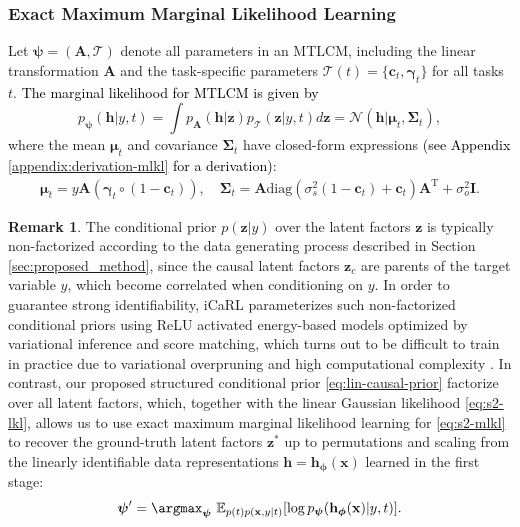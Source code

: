 \documentclass[10pt]{article} %
\theoremstyle{plain}
\theoremstyle{definition}
\newtheorem{remark}[theorem]{Remark}
\begin{document}
\subsubsection{Exact Maximum Marginal Likelihood Learning}
Let $\boldsymbol{\psi}=(\mathbf{A},\mathcal{T})$ denote all parameters in an MTLCM, including the linear transformation $\mathbf{A}$ and the task-specific parameters $\mathcal{T}(t)=\{\mathbf{c}_t,\boldsymbol{\gamma}_t\}$ for all tasks $t$. \textcolor{black}{The marginal likelihood for MTLCM is given by}
\begin{equation}\label{eq:s2-mlkl}
    p_{\boldsymbol{\psi}}(\mathbf{h}|y,t)=\int p_{\mathbf{A}}(\mathbf{h}|\mathbf{z})p_{\mathcal{T}}(\mathbf{z}|y,t)d\mathbf{z}
    =\mathcal{N}(\mathbf{h}|\boldsymbol{\mu}_t,\boldsymbol{\Sigma}_t),
\end{equation}
where the mean $\boldsymbol{\mu}_t$ and covariance $\boldsymbol{\Sigma}_t$ have closed-form expressions \textcolor{black}{(see Appendix \ref{appendix:derivation-mlkl} for a derivation)}:
\begin{equation}\label{eq:mtlcm-mlkl-mean-var}
\begin{split}
    \boldsymbol{\mu}_t = y\mathbf{A}(\boldsymbol{\gamma}_t\circ(1-\mathbf{c}_t)),\quad
    \boldsymbol{\Sigma}_t = \mathbf{A}\text{diag}(\sigma_{s}^{2}(1-\mathbf{c}_t)+\mathbf{c}_t)\mathbf{A}^{\text{T}}+\sigma_o^2\mathbf{I}.
\end{split}
\end{equation}
\begin{remark}
    The conditional prior $p(\mathbf{z}|y)$ over the latent factors $\mathbf{z}$ is typically non-factorized according to the data generating process described in Section \ref{sec:proposed_method}, since the causal latent factors $\mathbf{z}_c$ are parents of the target variable $y$, which become correlated when conditioning on $y$. 
    In order to guarantee strong identifiability, iCaRL \citep{Lu_Wu_Hernandez-Lobato_Scholkopf_2022} parameterizes such non-factorized conditional priors using ReLU activated energy-based models optimized by variational inference and score matching, which turns out to be difficult to train in practice due to variational overpruning \citep{trippe2018overpruning} and high computational complexity \citep{hyvarinen2005estimation}. In contrast, our proposed structured conditional prior \eqref{eq:lin-causal-prior} factorize over all latent factors, which, together with the linear Gaussian likelihood \eqref{eq:s2-lkl}, allows us to use exact maximum marginal likelihood learning for \eqref{eq:s2-mlkl} to recover the ground-truth latent factors $\mathbf{z}^*$ up to permutations and scaling from the linearly identifiable data representations $\mathbf{h}=\mathbf{h}_{\boldsymbol{\phi}}(\mathbf{x})$ learned in the first stage:
\begin{align}\label{eq:mtlcm-loss}
    \boldsymbol{\psi}'=\argmax_{\boldsymbol{\psi}}~\mathbb{E}_{p(t)p(\mathbf{x},y|t)}[\log p_{\boldsymbol{\psi}}(\mathbf{h}_{\boldsymbol{\phi}}(\mathbf{x})|y,t)].
\end{align}
\end{remark}
\end{document}
